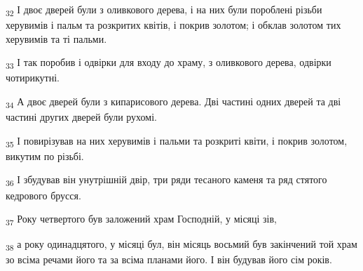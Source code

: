 \begin{tcolorbox}
\textsubscript{32} І двоє дверей були з оливкового дерева, і на них були пороблені різьби херувимів і пальм та розкритих квітів, і покрив золотом; і обклав золотом тих херувимів та ті пальми.
\end{tcolorbox}
\begin{tcolorbox}
\textsubscript{33} І так поробив і одвірки для входу до храму, з оливкового дерева, одвірки чотирикутні.
\end{tcolorbox}
\begin{tcolorbox}
\textsubscript{34} А двоє дверей були з кипарисового дерева. Дві частині одних дверей та дві частині других дверей були рухомі.
\end{tcolorbox}
\begin{tcolorbox}
\textsubscript{35} І повирізував на них херувимів і пальми та розкриті квіти, і покрив золотом, викутим по різьбі.
\end{tcolorbox}
\begin{tcolorbox}
\textsubscript{36} І збудував він унутрішній двір, три ряди тесаного каменя та ряд стятого кедрового брусся.
\end{tcolorbox}
\begin{tcolorbox}
\textsubscript{37} Року четвертого був заложений храм Господній, у місяці зів,
\end{tcolorbox}
\begin{tcolorbox}
\textsubscript{38} а року одинадцятого, у місяці бул, він місяць восьмий був закінчений той храм зо всіма речами його та за всіма планами його. І він будував його сім років.
\end{tcolorbox}
